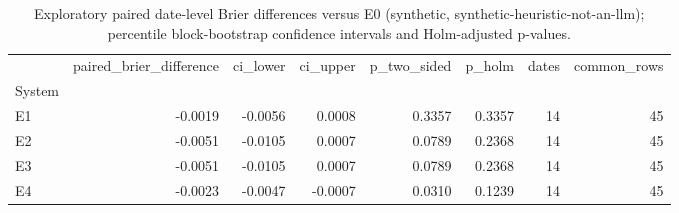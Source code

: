 \begin{table}
\caption{Exploratory paired date-level Brier differences versus E0 (synthetic, synthetic-heuristic-not-an-llm); percentile block-bootstrap confidence intervals and Holm-adjusted p-values.}
\label{tab:investiq-comparisons}
\begin{tabular}{lrrrrrrr}
\toprule
 & paired_brier_difference & ci_lower & ci_upper & p_two_sided & p_holm & dates & common_rows \\
System &  &  &  &  &  &  &  \\
\midrule
E1 & -0.0019 & -0.0056 & 0.0008 & 0.3357 & 0.3357 & 14 & 45 \\
E2 & -0.0051 & -0.0105 & 0.0007 & 0.0789 & 0.2368 & 14 & 45 \\
E3 & -0.0051 & -0.0105 & 0.0007 & 0.0789 & 0.2368 & 14 & 45 \\
E4 & -0.0023 & -0.0047 & -0.0007 & 0.0310 & 0.1239 & 14 & 45 \\
\bottomrule
\end{tabular}
\end{table}
